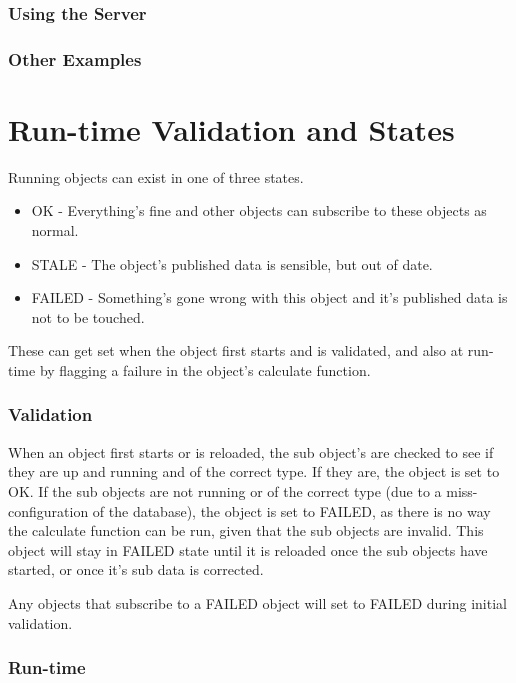 \documentclass{report}
\begin{document}
\subsubsection{Using the Server}

\subsubsection{Other Examples}

\section{Run-time Validation and States}

Running objects can exist in one of three states.

\begin{itemize}
\item OK - Everything's fine and other objects can subscribe to these objects as normal.
\item STALE - The object's published data is sensible, but out of date. 
\item FAILED - Something's gone wrong with this object and it's published data is not to be touched.
\end{itemize}

These can get set when the object first starts and is validated, and also at run-time by flagging a failure in the object's calculate function.

\subsubsection{Validation}

When an object first starts or is reloaded, the sub object's are checked to see if they are up and running and of the correct type. If they are, the object is set to OK. If the sub objects are not running or of the correct type (due to a miss-configuration of the database), the object is set to FAILED, as there is no way the calculate function can be run, given that the sub objects are invalid. This object will stay in FAILED state until it is reloaded once the sub objects have started, or once it's sub data is corrected.

Any objects that subscribe to a FAILED object will set to FAILED during initial validation. 

\subsubsection{Run-time}
\end{document}
